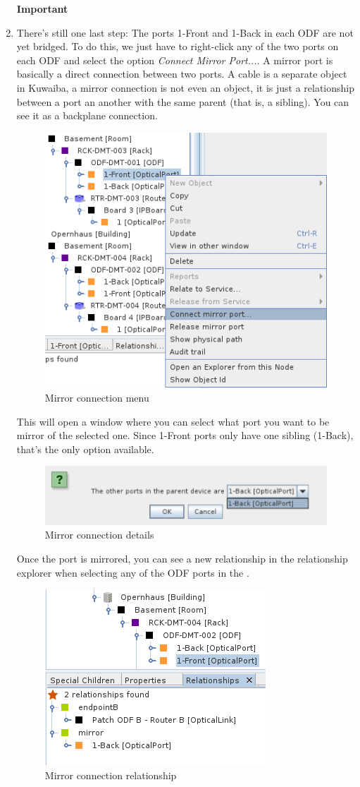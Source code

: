 \documentclass[a4paper]{article}
\begin{document}
\begin{enumerate}
\begin{framed} {\large \textbf{Important}}
					\end{framed}
					\item There's still one last step: The ports 1-Front and 1-Back in each ODF are not yet bridged. To do this, we just have to right-click any of the two ports on each ODF and select the option \textit{Connect Mirror Port...}. A mirror port is basically a direct connection between two ports. A cable is a separate object in Kuwaiba, a mirror connection is not even an object, it is just a relationship between a port an another with the same parent (that is, a sibling). You can see it as a backplane connection.
					\begin{figure}[h!]
						\centering
						\includegraphics[width=0.5\linewidth]{img/l1_example_2_mirror_connection_menu.png}
						\caption{Mirror connection menu}
						\label{fig:l1_example_2_mirror_connection_menu}
					\end{figure}
					\newpage
					This will open a window where you can select what port you want to be mirror of the selected one. Since 1-Front ports only have one sibling (1-Back), that's the only option available.
					\begin{figure}[h!]
						\centering
						\includegraphics[width=0.5\linewidth]{img/l1_example_2_mirror_connection_details.png}
						\caption{Mirror connection details}
						\label{fig:l1_example_2_mirror_connection_details}
					\end{figure}
					
					Once the port is mirrored, you can see a new relationship in the relationship explorer when selecting any of the ODF ports in the \textbf{}.
					\begin{figure}[h!]
						\centering
						\includegraphics[width=0.4\linewidth]{img/l1_example_2_mirror_connection_relationships.png}
						\caption{Mirror connection relationship}
						\label{fig:l1_example_2_mirror_connection_relationships}
					\end{figure}
					

\end{enumerate}
\end{document}
